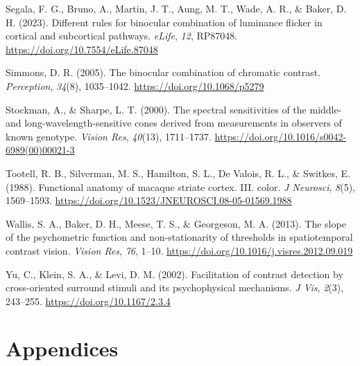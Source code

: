 \documentclass[
  letterpaper,
  DIV=11,
  numbers=noendperiod]{scrartcl}
\newlength{\cslhangindent}
\newlength{\cslentryspacingunit} %
\newenvironment{CSLReferences}[2] %
 {%
  \setlength{\parindent}{0pt}
  \ifodd #1
  \let\oldpar\par
  \def\par{\hangindent=\cslhangindent\oldpar}
  \fi
  \setlength{\parskip}{#2\cslentryspacingunit}
 }%
 {}
\begin{document}
\begin{CSLReferences}{1}{0}
\leavevmode{}%
Segala, F. G., Bruno, A., Martin, J. T., Aung, M. T., Wade, A. R., \&
Baker, D. H. (2023). Different rules for binocular combination of
luminance flicker in cortical and subcortical pathways. \emph{eLife},
\emph{12}, RP87048. \url{https://doi.org/10.7554/eLife.87048}

\leavevmode{}%
Simmons, D. R. (2005). The binocular combination of chromatic contrast.
\emph{Perception}, \emph{34}(8), 1035--1042.
\url{https://doi.org/10.1068/p5279}

\leavevmode{}%
Stockman, A., \& Sharpe, L. T. (2000). The spectral sensitivities of the
middle- and long-wavelength-sensitive cones derived from measurements in
observers of known genotype. \emph{Vision Res}, \emph{40}(13),
1711--1737. \url{https://doi.org/10.1016/s0042-6989(00)00021-3}

\leavevmode{}%
Tootell, R. B., Silverman, M. S., Hamilton, S. L., De Valois, R. L., \&
Switkes, E. (1988). Functional anatomy of macaque striate cortex. III.
color. \emph{J Neurosci}, \emph{8}(5), 1569--1593.
\url{https://doi.org/10.1523/JNEUROSCI.08-05-01569.1988}

\leavevmode{}%
Wallis, S. A., Baker, D. H., Meese, T. S., \& Georgeson, M. A. (2013).
The slope of the psychometric function and non-stationarity of
thresholds in spatiotemporal contrast vision. \emph{Vision Res},
\emph{76}, 1--10. \url{https://doi.org/10.1016/j.visres.2012.09.019}

\leavevmode{}%
Yu, C., Klein, S. A., \& Levi, D. M. (2002). Facilitation of contrast
detection by cross-oriented surround stimuli and its psychophysical
mechanisms. \emph{J Vis}, \emph{2}(3), 243--255.
\url{https://doi.org/10.1167/2.3.4}

\end{CSLReferences}

\hypertarget{appendices}{%
\section{Appendices}\label{appendices}}

\beginsupplement
\end{document}
